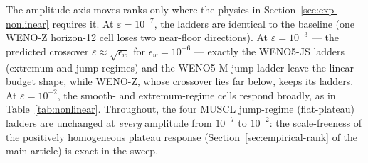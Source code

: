 \documentclass[11pt,a4paper]{article}
\begin{document}
The amplitude axis moves ranks only where the physics in Section~\ref{sec:exp-nonlinear} requires it.
At $\varepsilon=10^{-7}$, the ladders are identical to the baseline (one WENO-Z horizon-12 cell loses two near-floor directions).
At $\varepsilon=10^{-3}$ --- the predicted crossover $\varepsilon\approx\sqrt{\epsilon_w}$ for $\epsilon_w=10^{-6}$ --- exactly the WENO5-JS ladders (extremum and jump regimes) and the WENO5-M jump ladder leave the linear-budget shape, while WENO-Z, whose crossover lies far below, keeps its ladders.
At $\varepsilon=10^{-2}$, the smooth- and extremum-regime cells respond broadly, as in Table~\ref{tab:nonlinear}.
Throughout, the four MUSCL jump-regime (flat-plateau) ladders are unchanged at \emph{every} amplitude from $10^{-7}$ to $10^{-2}$: the scale-freeness of the positively homogeneous plateau response (Section~\ref{sec:empirical-rank} of the main article) is exact in the sweep.
\end{document}
